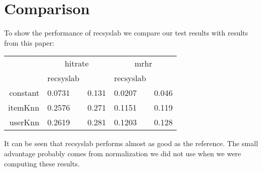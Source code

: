 \newpage
\section{Comparison}
To show the performance of recsyslab we compare our test results with results 
from this paper:~\cite{deshpande2004item}

\vspace{1.5 mm}
\begin{tabular}{rllll} \toprule
 & \multicolumn{2}{c}{hitrate} & \multicolumn{2}{c}{mrhr} \\ \cmidrule(r){2-3} \cmidrule(r){4-5}
 & recsyslab & \cite{deshpande2004item} & recsyslab & \cite{deshpande2004item} \\ \midrule
    constant & 0.0731 & 0.131 & 0.0207 & 0.046 \\
    itemKnn & 0.2576 & 0.271 & 0.1151 & 0.119 \\
    userKnn & 0.2619 & 0.281 & 0.1203 & 0.128 \\ \bottomrule
\end{tabular}
\vspace{1.5 mm}

It can be seen that recsyslab performs almost as good as the reference.
The small advantage probably comes from normalization we did not use when
we were computing these results.
